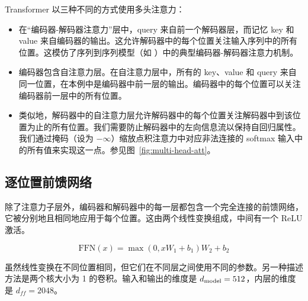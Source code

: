 Transformer 以三种不同的方式使用多头注意力：
\begin{itemize}
 \item 在``编码器-解码器注意力''层中，query 来自前一个解码器层，而记忆 key 和 value 来自编码器的输出。这允许解码器中的每个位置关注输入序列中的所有位置。这模仿了序列到序列模型（如 \citep{wu2016google, bahdanau2014neural,JonasFaceNet2017}）中的典型编码器-解码器注意力机制。

 \item 编码器包含自注意力层。在自注意力层中，所有的 key、value 和 query 来自同一位置，在本例中是编码器中前一层的输出。编码器中的每个位置可以关注编码器前一层中的所有位置。

 \item 类似地，解码器中的自注意力层允许解码器中的每个位置关注解码器中到该位置为止的所有位置。我们需要防止解码器中的左向信息流以保持自回归属性。我们通过掩码（设为 $-\infty$）缩放点积注意力中对应非法连接的 softmax 输入中的所有值来实现这一点。参见图~\ref{fig:multi-head-att}。

\end{itemize}

\subsection{逐位置前馈网络}\label{sec:ffn}

除了注意力子层外，编码器和解码器中的每一层都包含一个完全连接的前馈网络，它被分别地且相同地应用于每个位置。这由两个线性变换组成，中间有一个 ReLU 激活。

\begin{equation}
   \mathrm{FFN}(x)=\max(0, xW_1 + b_1) W_2 + b_2
\end{equation}

虽然线性变换在不同位置相同，但它们在不同层之间使用不同的参数。另一种描述方法是两个核大小为 1 的卷积。输入和输出的维度是 $d_{\text{model}}=512$，内层的维度是 $d_{ff}=2048$。






